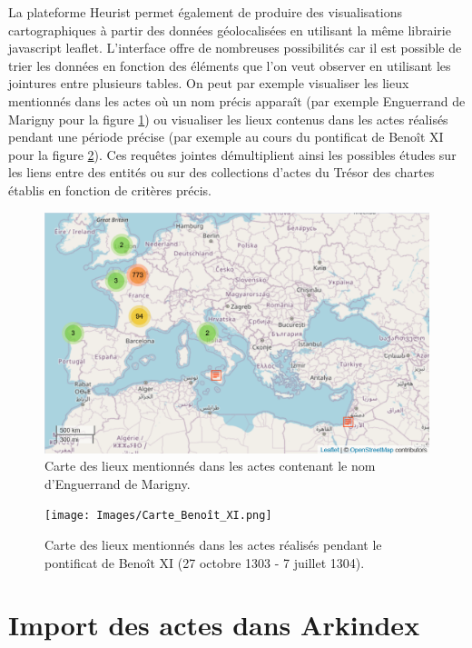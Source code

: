 \documentclass[a4paper,12pt,twoside]{book}
\begin{document}
	La plateforme Heurist permet également de produire des visualisations cartographiques à partir des données géolocalisées en utilisant la même librairie javascript leaflet. L'interface offre de nombreuses possibilités car il est possible de trier les données en fonction des éléments que l'on veut observer en utilisant les jointures entre plusieurs tables. On peut par exemple visualiser les lieux mentionnés dans les actes où un nom précis apparaît (par exemple Enguerrand de Marigny pour la figure \ref{Carte_Enguerrand_Marigny}) ou visualiser les lieux contenus dans les actes réalisés pendant une période précise (par exemple au cours du pontificat de Benoît XI pour la figure \ref{Carte_Benoit_XI}). Ces requêtes jointes démultiplient ainsi les possibles études sur les liens entre des entités ou sur des collections d'actes du Trésor des chartes établis en fonction de critères précis.
	
	\begin{figure}
		\centering
		\includegraphics[width=\textwidth]{Images/Carte_Marigny.png}
		\caption{Carte des lieux mentionnés dans les actes contenant le nom d'Enguerrand de Marigny.}
		\label{Carte_Enguerrand_Marigny}
	\end{figure}

	\begin{figure}
		\centering
		\texttt{[image: Images/Carte\_Benoît\_XI.png]}
		\caption{Carte des lieux mentionnés dans les actes réalisés pendant le pontificat de Benoît XI (27 octobre 1303 - 7 juillet 1304).}
		\label{Carte_Benoit_XI}
	\end{figure}
	
	\section{Import des actes dans Arkindex}
	
\end{document}
